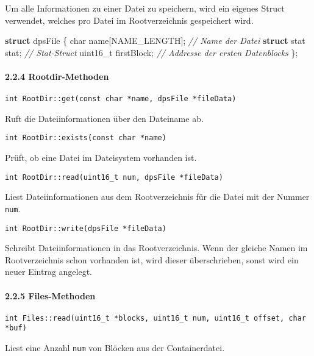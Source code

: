 \documentclass[]{article}
\newenvironment{Shaded}{}{}
\newcommand{\CommentTok}[1]{\textcolor[rgb]{0.38,0.63,0.69}{\textit{#1}}}
\newcommand{\DataTypeTok}[1]{\textcolor[rgb]{0.56,0.13,0.00}{#1}}
\newcommand{\KeywordTok}[1]{\textcolor[rgb]{0.00,0.44,0.13}{\textbf{#1}}}
\newcommand{\NormalTok}[1]{#1}
\let\oldparagraph\paragraph
\renewcommand{\paragraph}[1]{\oldparagraph{#1}\mbox{}}
\begin{document}
Um alle Informationen zu einer Datei zu speichern, wird ein eigenes
Struct verwendet, welches pro Datei im Rootverzeichnis gespeichert wird.

\begin{Shaded}
  \begin{framed}
\begin{Highlighting}[]
\KeywordTok{struct}\NormalTok{ dpsFile \{}
    \DataTypeTok{char}\NormalTok{ name[NAME_LENGTH]; }\CommentTok{// Name der Datei}
    \KeywordTok{struct}\NormalTok{ stat stat;       }\CommentTok{// Stat-Struct}
    \DataTypeTok{uint16_t}\NormalTok{ firstBlock;    }\CommentTok{// Addresse der ersten Datenblocks}
\NormalTok{\};}
\end{Highlighting}
\end{framed}
\end{Shaded}

\hypertarget{rootdir-methoden}{%
\paragraph{2.2.4 Rootdir-Methoden}\label{rootdir-methoden}}

\texttt{int\ RootDir::get(const\ char\ *name,\ dpsFile\ *fileData)}

Ruft die Dateiinformationen über den Dateiname ab.

\texttt{int\ RootDir::exists(const\ char\ *name)}

Prüft, ob eine Datei im Dateisystem vorhanden ist.

\texttt{int\ RootDir::read(uint16\_t\ num,\ dpsFile\ *fileData)}

Liest Dateiinformationen aus dem Rootverzeichnis für die Datei mit der
Nummer \texttt{num}.

\texttt{int\ RootDir::write(dpsFile\ *fileData)}

Schreibt Dateiinformationen in das Rootverzeichnis. Wenn der gleiche
Namen im Rootverzeichnis schon vorhanden ist, wird dieser überschrieben,
sonst wird ein neuer Eintrag angelegt.

\hypertarget{files-methoden}{%
\paragraph{2.2.5 Files-Methoden}\label{files-methoden}}

\texttt{int\ Files::read(uint16\_t\ *blocks,\ uint16\_t\ num,\ uint16\_t\ offset,\ char\ *buf)}

Liest eine Anzahl \texttt{num} von Blöcken aus der Containerdatei.
\end{document}

